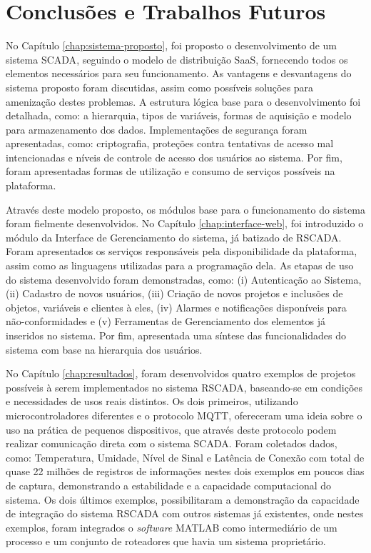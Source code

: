 \chapter{Conclusões e Trabalhos Futuros}
\label{chap:conclusoes-e-trabalhos-futuros}

No Capítulo \ref{chap:sistema-proposto}, foi proposto o desenvolvimento de um sistema \gls{SCADA}, seguindo o modelo de distribuição \gls{SaaS}, fornecendo todos os elementos necessários para seu funcionamento. As vantagens e desvantagens do sistema proposto foram discutidas, assim como possíveis soluções para amenização destes problemas. A estrutura lógica base para o desenvolvimento foi detalhada, como: a hierarquia, tipos de variáveis, formas de aquisição e  modelo para armazenamento dos dados. Implementações de segurança foram apresentadas, como: criptografia, proteções contra tentativas de acesso mal intencionadas e níveis de controle de acesso dos usuários ao sistema. Por fim, foram apresentadas formas de utilização e consumo de serviços possíveis na plataforma.

Através deste modelo proposto, os módulos base para o funcionamento do sistema foram fielmente desenvolvidos. No Capítulo \ref{chap:interface-web}, foi introduzido o módulo da Interface de Gerenciamento do sistema, já batizado de RSCADA. Foram apresentados os serviços responsáveis pela disponibilidade da plataforma, assim como as linguagens utilizadas para a programação dela. As  etapas de uso do sistema desenvolvido foram demonstradas, como: (i) Autenticação ao Sistema, (ii) Cadastro de novos usuários, (iii) Criação de novos projetos e inclusões de objetos, variáveis e clientes à eles, (iv) Alarmes e notificações disponíveis para não-conformidades e (v) Ferramentas de Gerenciamento dos elementos já inseridos no sistema. Por fim, apresentada uma síntese das  funcionalidades do sistema com base na hierarquia dos usuários.

No Capítulo \ref{chap:resultados}, foram desenvolvidos quatro exemplos de projetos possíveis à serem implementados no sistema RSCADA, baseando-se em condições e necessidades de usos reais distintos. Os dois primeiros, utilizando microcontroladores diferentes e o protocolo \gls{MQTT}, ofereceram uma ideia sobre o uso na prática de pequenos dispositivos, que através deste protocolo podem realizar comunicação direta com o sistema \gls{SCADA}. Foram coletados dados, como: Temperatura, Umidade, Nível de Sinal e Latência de Conexão com total de quase 22 milhões de registros de informações nestes dois exemplos em poucos dias de captura, demonstrando a estabilidade e a capacidade computacional do sistema. Os dois últimos exemplos, possibilitaram a demonstração da capacidade de integração do sistema RSCADA com outros sistemas já existentes, onde nestes exemplos, foram integrados o \textit{software} MATLAB como intermediário de um processo e um conjunto de roteadores que havia um sistema proprietário.

